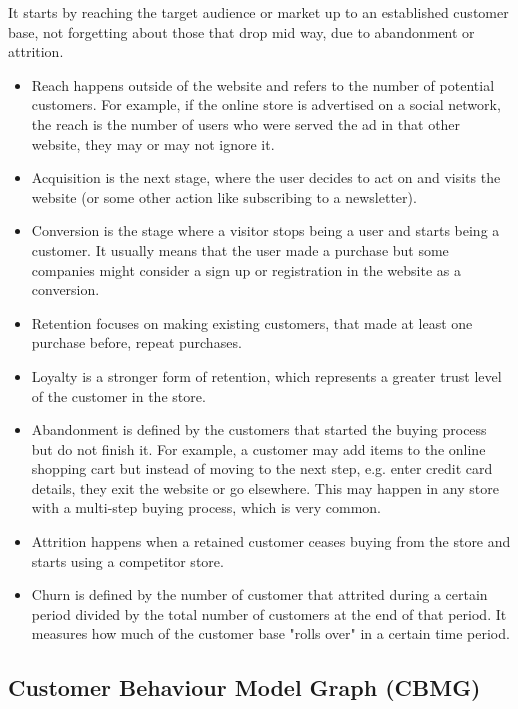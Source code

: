 It starts by reaching the target audience or market up to an established 
customer base, not forgetting about those that drop mid way, due to abandonment 
or attrition.

\begin{itemize}
    \item Reach happens outside of the website and refers to the number of 
    potential customers. For example, if the online store is advertised on a 
    social network, the reach is the number of users who were served the ad in 
    that other website, they may or may not ignore it.
    \item Acquisition is the next stage, where the user decides to act on and 
    visits the website (or some other action like subscribing to a newsletter).
    \item Conversion is the stage where a visitor stops being a user and starts 
    being a customer. It usually means that the user made a purchase but some 
    companies might consider a sign up or registration in the website as a 
    conversion.
    \item Retention focuses on making existing customers, that made at least 
    one purchase before, repeat purchases.
    \item Loyalty is a stronger form of retention, which represents a greater 
    trust level of the customer in the store.
    \item Abandonment is defined by the customers that started the buying 
    process but do not finish it. For example, a customer may add items to the 
    online shopping cart but instead of moving to the next step, e.g. enter 
    credit card details, they exit the website or go elsewhere. This may happen 
    in any store with a multi-step buying process, which is very common.
    \item Attrition happens when a retained customer ceases buying from the 
    store and starts using a competitor store.
    \item Churn is defined by the number of customer that attrited during a 
    certain period divided by the total number of customers at the end of that 
    period. It measures how much of the customer base "rolls over" in a certain 
    time period.
\end{itemize}

\subsection{Customer Behaviour Model Graph (CBMG)}

